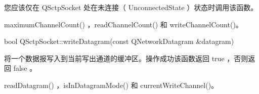 您应该仅在 QSctpSocket 处在未连接（ UnconnectedState ）状态时调用该函数。

\begin{seeAlso}
maximumChannelCount() ，readChannelCount() 和 writeChannelCount()。
\end{seeAlso}

bool QSctpSocket::writeDatagram(const QNetworkDatagram \&datagram)

将一个数据报写入到当前写出通道的缓冲区。操作成功该函数返回 true ，否则返回 false 。

\begin{seeAlso}
readDatagram() ，isInDatagramMode() 和 currentWriteChannel()。
\end{seeAlso}